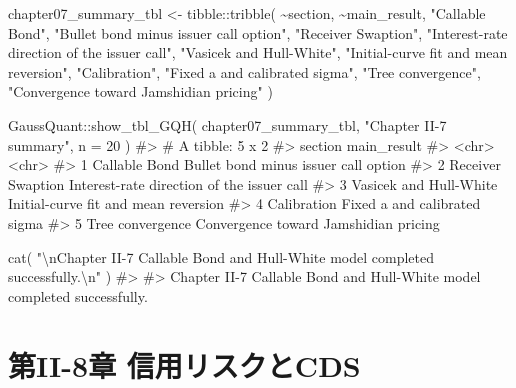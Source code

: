 \documentclass[
  letterpaper,
  DIV=11,
  numbers=noendperiod]{scrreprt}
\newenvironment{Shaded}{\begin{snugshade}}{\end{snugshade}}
\newcommand{\AttributeTok}[1]{\textcolor[rgb]{0.40,0.45,0.13}{#1}}
\newcommand{\CommentTok}[1]{\textcolor[rgb]{0.37,0.37,0.37}{#1}}
\newcommand{\DecValTok}[1]{\textcolor[rgb]{0.68,0.00,0.00}{#1}}
\newcommand{\FunctionTok}[1]{\textcolor[rgb]{0.28,0.35,0.67}{#1}}
\newcommand{\NormalTok}[1]{\textcolor[rgb]{0.00,0.23,0.31}{#1}}
\newcommand{\OtherTok}[1]{\textcolor[rgb]{0.00,0.23,0.31}{#1}}
\newcommand{\SpecialCharTok}[1]{\textcolor[rgb]{0.37,0.37,0.37}{#1}}
\newcommand{\StringTok}[1]{\textcolor[rgb]{0.13,0.47,0.30}{#1}}
\begin{document}
\begin{Shaded}
\begin{Highlighting}[]
\NormalTok{chapter07\_summary\_tbl }\OtherTok{\textless{}{-}}\NormalTok{ tibble}\SpecialCharTok{::}\FunctionTok{tribble}\NormalTok{(}
  \SpecialCharTok{\textasciitilde{}}\NormalTok{section,                  }\SpecialCharTok{\textasciitilde{}}\NormalTok{main\_result,}
  \StringTok{"Callable Bond"}\NormalTok{,           }\StringTok{"Bullet bond minus issuer call option"}\NormalTok{,}
  \StringTok{"Receiver Swaption"}\NormalTok{,       }\StringTok{"Interest{-}rate direction of the issuer call"}\NormalTok{,}
  \StringTok{"Vasicek and Hull{-}White"}\NormalTok{,  }\StringTok{"Initial{-}curve fit and mean reversion"}\NormalTok{,}
  \StringTok{"Calibration"}\NormalTok{,             }\StringTok{"Fixed a and calibrated sigma"}\NormalTok{,}
  \StringTok{"Tree convergence"}\NormalTok{,        }\StringTok{"Convergence toward Jamshidian pricing"}
\NormalTok{)}

\NormalTok{GaussQuant}\SpecialCharTok{::}\FunctionTok{show\_tbl\_GQH}\NormalTok{(}
\NormalTok{  chapter07\_summary\_tbl,}
  \StringTok{"Chapter II{-}7 summary"}\NormalTok{,}
  \AttributeTok{n =} \DecValTok{20}
\NormalTok{)}
\CommentTok{\#\textgreater{} \# A tibble: 5 x 2}
\CommentTok{\#\textgreater{}   section                main\_result                               }
\CommentTok{\#\textgreater{}   \textless{}chr\textgreater{}                  \textless{}chr\textgreater{}                                     }
\CommentTok{\#\textgreater{} 1 Callable Bond          Bullet bond minus issuer call option      }
\CommentTok{\#\textgreater{} 2 Receiver Swaption      Interest{-}rate direction of the issuer call}
\CommentTok{\#\textgreater{} 3 Vasicek and Hull{-}White Initial{-}curve fit and mean reversion      }
\CommentTok{\#\textgreater{} 4 Calibration            Fixed a and calibrated sigma              }
\CommentTok{\#\textgreater{} 5 Tree convergence       Convergence toward Jamshidian pricing}

\FunctionTok{cat}\NormalTok{(}
  \StringTok{"}\SpecialCharTok{\textbackslash{}n}\StringTok{Chapter II{-}7 Callable Bond and Hull{-}White model completed successfully.}\SpecialCharTok{\textbackslash{}n}\StringTok{"}
\NormalTok{)}
\CommentTok{\#\textgreater{} }
\CommentTok{\#\textgreater{} Chapter II{-}7 Callable Bond and Hull{-}White model completed successfully.}
\end{Highlighting}
\end{Shaded}

\chapter{第II-8章
信用リスクとCDS}\label{ux7b2cii-8ux7ae0-ux4fe1ux7528ux30eaux30b9ux30afux3068cds}
\end{document}
